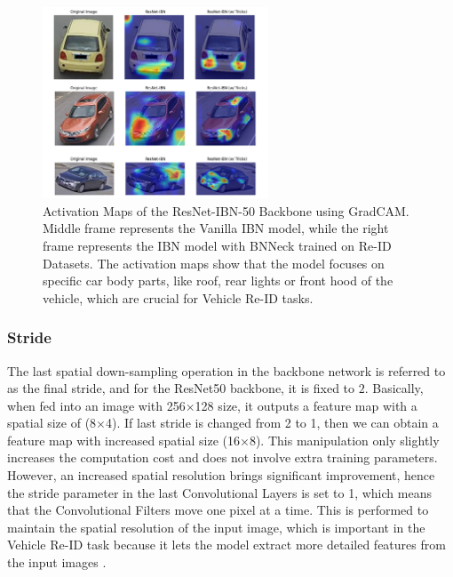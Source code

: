 \begin{figure}[H] 
    \centering
    \includegraphics[width=0.60\textwidth]{images/ActivationMaps2.png}
    \caption[Activation Maps for ResNet-IBN]{Activation Maps of the ResNet-IBN-50 Backbone using GradCAM. Middle frame represents the Vanilla IBN model, while the right frame represents the IBN model with BNNeck trained on Re-ID Datasets. The activation maps show that the model focuses on specific car body parts, like roof, rear lights or front hood of the vehicle, which are crucial for Vehicle Re-ID tasks.}
    \label{fig:ActivationMaps}
\end{figure}

\subsubsection{Stride}
\label{subsubsec:Stride}
The last spatial down-sampling operation in the backbone network is referred to as the final stride, and for the ResNet50 backbone, it is fixed to $2$. Basically, when fed into an image with 256$\times$128 size, it outputs a feature map with a spatial size of (8$\times$4). If last stride is changed from 2 to 1, then we can obtain a feature map with increased spatial size (16$\times$8). This manipulation only slightly increases the computation cost and does not involve extra training parameters. However, an increased spatial resolution brings significant improvement, hence the stride parameter in the last Convolutional Layers is set to 1, which means that the Convolutional Filters move one pixel at a time. This is performed to maintain the spatial resolution of the input image, which is important in the Vehicle Re-ID task because it lets the model extract more detailed features from the input images \cite{StrongBaselineBatchNorm}.

